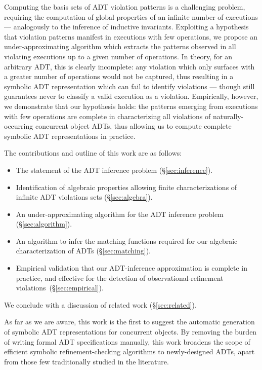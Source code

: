 Computing the basis sets of ADT violation patterns is a challenging problem,
requiring the computation of global properties of an infinite number of
executions — analogously to the inference of inductive invariants. Exploiting a
hypothesis that violation patterns manifest in executions with few operations,
we propose an under-approximating algorithm which extracts the patterns
observed in all violating executions up to a given number of operations. In
theory, for an arbitrary ADT, this is clearly incomplete: any violation which
only surfaces with a greater number of operations would not be captured, thus
resulting in a symbolic ADT representation which can fail to identify
violations — though still guarantees never to classify a valid execution as a
violation. Empirically, however, we demonstrate that our hypothesis holds: the
patterns emerging from executions with few operations are complete in
characterizing all violations of naturally-occurring concurrent object ADTs,
thus allowing us to compute complete symbolic ADT representations in practice.

The contributions and outline of this work are as follows:
\begin{itemize}

  \item The statement of the ADT inference problem (§\ref{sec:inference}).

  \item Identification of algebraic properties allowing finite
  characterizations of infinite ADT violations sets (§\ref{sec:algebra}).

  \item An under-approximating algorithm for the ADT inference problem
  (§\ref{sec:algorithm}).

  \item An algorithm to infer the matching functions required for our algebraic
  characterization of ADTs (§\ref{sec:matching}).

  \item Empirical validation that our ADT-inference approximation is complete
  in practice, and effective for the detection of observational-refinement
  violations~(§\ref{sec:empirical}).

\end{itemize}
We conclude with a discussion of related work (§\ref{sec:related}).

As far as we are aware, this work is the first to suggest the automatic
generation of symbolic ADT representations for concurrent objects. By removing
the burden of writing formal ADT specifications manually, this work broadens
the scope of efficient symbolic refinement-checking algorithms to
newly-designed ADTs, apart from those few traditionally studied in the
literature.
